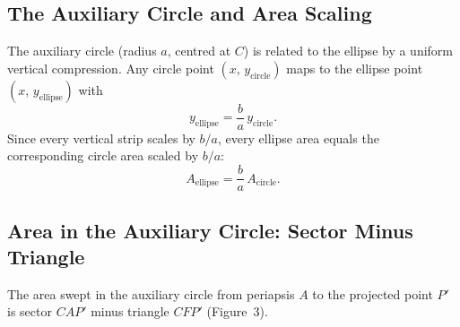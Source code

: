 \documentclass[12pt]{article}
\begin{document}
\subsection{The Auxiliary Circle and Area Scaling}

The auxiliary circle (radius $a$, centred at $C$) is related to the ellipse by a
uniform vertical compression. Any circle point $(x,\,y_{\text{circle}})$ maps to
the ellipse point $(x,\,y_{\text{ellipse}})$ with
\[
  y_{\text{ellipse}} = \frac{b}{a}\,y_{\text{circle}}.
\]
Since every vertical strip scales by $b/a$, every ellipse area equals the
corresponding circle area scaled by $b/a$:
\[
  A_{\text{ellipse}} = \frac{b}{a}\,A_{\text{circle}}. \tag{2}
\]

\newpage
\subsection{Area in the Auxiliary Circle: Sector Minus Triangle}

The area swept in the auxiliary circle from periapsis $A$ to the projected point
$P'$ is sector $CAP'$ minus triangle $CFP'$ (Figure~3).
\vspace{0.4cm}
\end{document}
